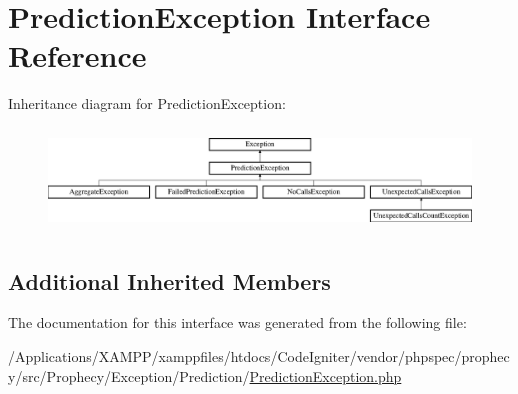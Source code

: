\hypertarget{interface_prophecy_1_1_exception_1_1_prediction_1_1_prediction_exception}{}\section{Prediction\+Exception Interface Reference}
\label{interface_prophecy_1_1_exception_1_1_prediction_1_1_prediction_exception}
Inheritance diagram for Prediction\+Exception\+:\begin{figure}[H]
\begin{center}
\leavevmode
\includegraphics[height=2.772277cm]{interface_prophecy_1_1_exception_1_1_prediction_1_1_prediction_exception}
\end{center}
\end{figure}
\subsection*{Additional Inherited Members}


The documentation for this interface was generated from the following file\+:\begin{DoxyCompactItemize}
\item 
/\+Applications/\+X\+A\+M\+P\+P/xamppfiles/htdocs/\+Code\+Igniter/vendor/phpspec/prophecy/src/\+Prophecy/\+Exception/\+Prediction/\mbox{\hyperlink{_prediction_exception_8php}{Prediction\+Exception.\+php}}\end{DoxyCompactItemize}
